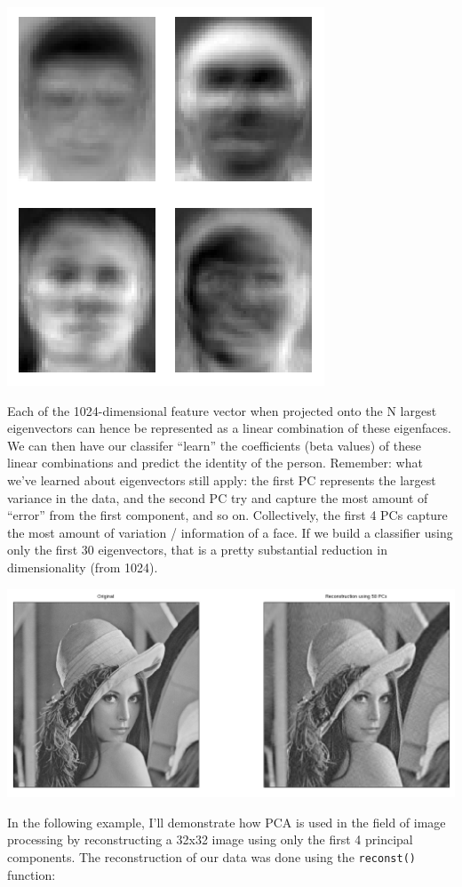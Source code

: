 \documentclass[]{article}
\begin{document}
\includegraphics{assets/eigenfaces.png}

Each of the 1024-dimensional feature vector when projected onto the N
largest eigenvectors can hence be represented as a linear combination of
these eigenfaces. We can then have our classifer ``learn'' the
coefficients (beta values) of these linear combinations and predict the
identity of the person. Remember: what we've learned about eigenvectors
still apply: the first PC represents the largest variance in the data,
and the second PC try and capture the most amount of ``error'' from the
first component, and so on. Collectively, the first 4 PCs capture the
most amount of variation / information of a face. If we build a
classifier using only the first 30 eigenvectors, that is a pretty
substantial reduction in dimensionality (from 1024).

\includegraphics{assets/lenna.png}

In the following example, I'll demonstrate how PCA is used in the field
of image processing by reconstructing a 32x32 image using only the first
4 principal components. The reconstruction of our data was done using
the \texttt{reconst()} function:
\end{document}

